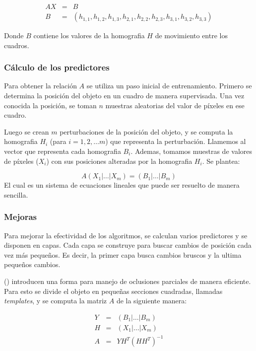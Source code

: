 \documentclass[a4paper,10pt]{article}
\begin{document}
\begin{eqnarray*}
    AX &=& B \\
    B &=& (h_{1,1}, h_{1,2}, h_{1,3}, h_{2,1}, h_{2,2}, h_{2,3}, h_{3,1}, h_{3,2}, h_{3,3})
\end{eqnarray*}

Donde $B$ contiene los valores de la homografia $H$ de movimiento entre los cuadros.

\subsubsection{Cálculo de los predictores}
Para obtener la relación $A$ se utiliza un paso inicial de entrenamiento.
Primero se determina la posición del objeto en un cuadro de manera supervisada.
Una vez conocida la posición, se toman $n$ muestras aleatorias del valor de
píxeles en ese cuadro.

Luego se crean $m$ perturbaciones de la posición del objeto, y se computa la
homografia $H_i$ (para $i = 1, 2, \dots m$) que representa la perturbación.
Llamemos al vector que representa cada homografia $B_i$. Ademas, tomamos
muestras de valores de píxeles ($X_i$) con sus posiciones alteradas por la
homografia $H_i$. Se plantea:

\begin{equation}
    A \left( X_1 \lvert \dots \lvert X_m \right) = \left( B_1 \lvert \dots \lvert B_m \right)
\end{equation}
El cual es un sistema de ecuaciones lineales que puede ser resuelto de manera sencilla.

\subsubsection{Mejoras}

Para mejorar la efectividad de los algoritmos, se calculan varios predictores y se disponen en capas.
Cada capa se construye para buscar cambios de posición cada vez más pequeños.
Es decir, la primer capa busca cambios bruscos y la ultima pequeños cambios.

\citeauthor*{alp} (\cite{alp}) introducen una forma para manejo de oclusiones
parciales de manera eficiente. Para esto se divide el objeto en pequeñas
secciones cuadradas, llamadas \textit{templates}, y se computa la matriz $A$ de
la siguiente manera:

\begin{eqnarray*}
    Y &=& \left( B_1 \lvert \dots \lvert B_m \right) \\
    H &=& \left( X_1 \lvert \dots \lvert X_m \right) \\
    A &=& Y H^T(HH^T)^{-1}
\end{eqnarray*}
\end{document}
